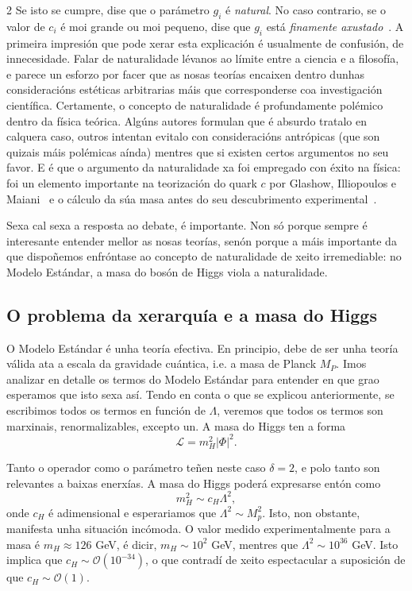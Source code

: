 \begin{multicols}{2}
Se isto se cumpre, dise que o parámetro $g_i$ é \textit{natural}. No caso
contrario, se o valor de $c_i$ é moi grande ou moi pequeno, dise que $g_i$ está
\textit{finamente axustado}~\cite{Wells}. A primeira impresión que pode xerar
esta explicación é usualmente de confusión, de innecesidade. Falar de
naturalidade lévanos ao límite entre a ciencia e a filosofía, e parece un
esforzo por facer que as nosas teorías encaixen dentro dunhas consideracións
estéticas arbitrarias máis que corresponderse coa investigación científica.
Certamente, o concepto de naturalidade é profundamente polémico dentro da
física teórica. Algúns autores formulan que é absurdo tratalo en calquera caso,
outros intentan evitalo con consideracións antrópicas (que son quizais máis
polémicas aínda) mentres que si existen certos argumentos no seu favor. E é que
o argumento da naturalidade xa foi empregado con éxito na física: foi un
elemento importante na teorización do quark $c$ por Glashow, Illiopoulos e
Maiani~\cite{GIM} e o cálculo da súa masa antes do seu descubrimento
experimental~\cite{GaillardLee}.

Sexa cal sexa a resposta ao debate, é importante. Non só porque sempre é
interesante entender mellor as nosas teorías, senón porque a máis importante da
que dispoñemos enfróntase ao concepto de naturalidade de xeito irremediable: no
Modelo Estándar, a masa do bosón de Higgs viola a naturalidade.

\subsection*{O problema da xerarquía e a masa do Higgs}

O Modelo Estándar é unha teoría efectiva. En principio, debe de ser unha teoría
válida ata a escala da gravidade cuántica, i.e. a masa de Planck $M_P$. Imos
analizar en detalle os termos do Modelo Estándar para entender en que grao
esperamos que isto sexa así. Tendo en conta o que se explicou anteriormente, se
escribimos todos os termos en función de $\Lambda$, veremos que todos os termos
son marxinais, renormalizables, excepto un. A masa do Higgs ten a forma
%
\begin{equation}
    \mathcal{L} = m^2_H |\Phi|^2.
\end{equation}

Tanto o operador como o parámetro teñen neste caso $\delta = 2$, e polo tanto
son relevantes a baixas enerxías. A masa do Higgs poderá expresarse entón
como~\cite{Hebecker}
%
\begin{equation}
    m^2_H \sim c_H \Lambda^2,
    \label{eq:H_mass}
\end{equation}
%
onde $c_H$ é adimensional e esperariamos que $\Lambda^2 \sim M^2_p$. Isto, non
obstante, manifesta unha situación incómoda. O valor medido experimentalmente
para a masa é $m_H \approx 126$ GeV, é dicir, $m_H \sim 10^2$ GeV, mentres que
$\Lambda^2 \sim 10^{36}$ GeV. Isto implica que $c_H \sim \mathcal{O}(10^{-34})$,
o que contradí de xeito espectacular a suposición de que $c_H \sim
\mathcal{O}(1)$.


\end{multicols}
